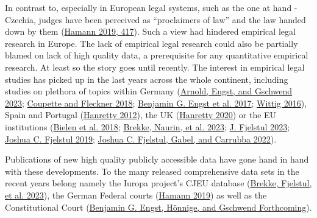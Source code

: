 \documentclass[
  11pt,
]{article}
\begin{document}
In contrast to, especially in European legal systems, such as the one at
hand - Czechia, judges have been perceived as ``proclaimers of law'' and
the law handed down by them
(\protect\hyperlink{ref-hamannGermanFederalCourts2019}{Hamann 2019,
417}). Such a view had hindered empirical legal research in Europe. The
lack of empirical legal research could also be partially blamed on lack
of high quality data, a prerequisite for any quantitative empirical
research. At least so the story goes until recently. The interest in
empirical legal studies has picked up in the last years across the whole
continent, including studies on plethora of topics within Germany
(\protect\hyperlink{ref-arnoldScalingCourtDecisions2023}{Arnold, Engst,
and Gschwend 2023};
\protect\hyperlink{ref-coupetteQuantitativeRechtswissenschaft2018}{Coupette
and Fleckner 2018};
\protect\hyperlink{ref-engstEinflussParteinaheAuf2017}{Benjamin G. Engst
et al. 2017};
\protect\hyperlink{ref-wittigOccurrenceSeparateOpinions2016}{Wittig
2016}), Spain and Portugal
(\protect\hyperlink{ref-hanrettyDissentIberiaIdeal2012}{Hanretty 2012}),
the UK
(\protect\hyperlink{ref-hanrettyCourtSpecialistsJudicial2020}{Hanretty
2020}) or the EU institutions
(\protect\hyperlink{ref-bielenBacklogsLitigationRates2018}{Bielen et al.
2018}; \protect\hyperlink{ref-brekkeThatOrderHow2023}{Brekke, Naurin, et
al. 2023}; \protect\hyperlink{ref-fjelstulHowChamberSystem2023}{J.
Fjelstul 2023};
\protect\hyperlink{ref-fjelstulEvolutionEuropeanUnion2019}{Joshua C.
Fjelstul 2019};
\protect\hyperlink{ref-fjelstulTimelyAdministrationJustice2022}{Joshua
C. Fjelstul, Gabel, and Carrubba 2022}).

Publications of new high quality publicly accessible data have gone hand
in hand with these developments. To the many released comprehensive data
sets in the recent years belong namely the Iuropa project's CJEU
database (\protect\hyperlink{ref-brekkeCJEUDatabasePlatform2023}{Brekke,
Fjelstul, et al. 2023}), the German Federal courts
(\protect\hyperlink{ref-hamannGermanFederalCourts2019}{Hamann 2019}) as
well as the Constitutional Court
(\protect\hyperlink{ref-engstConstitutionalCourtDatabaseForthcoming}{Benjamin
G. Engst, Hönnige, and Gschwend Forthcoming}).
\end{document}
